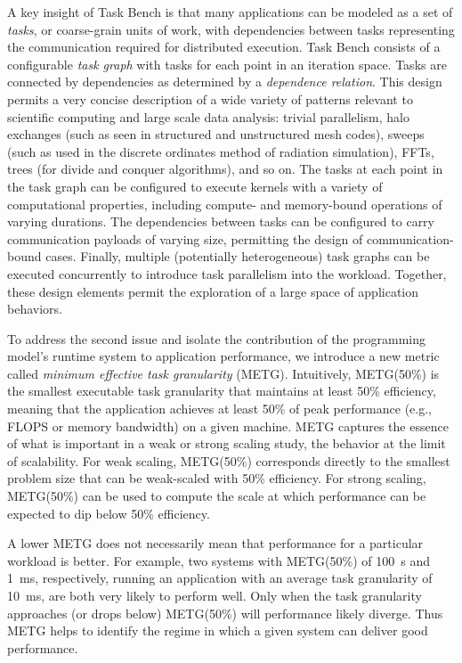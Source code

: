 A key insight of Task Bench is that many applications can be modeled
as a set of \emph{tasks}, or coarse-grain units of work, with
dependencies between tasks representing the communication required for
distributed execution. Task Bench consists of a configurable \emph{task graph} with tasks for
each point in an iteration space. Tasks are connected by dependencies
as determined by a \emph{dependence relation}. This design permits a
very concise description of a wide variety of patterns relevant to
scientific computing and large scale data analysis: trivial parallelism, halo exchanges (such as
seen in structured and unstructured mesh codes), sweeps (such as used
in the discrete ordinates method of radiation simulation), FFTs, trees
(for divide and conquer algorithms), and so on. The tasks at each
point in the task graph can be configured to execute kernels with a
variety of computational properties, including compute- and
memory-bound operations of varying durations. The dependencies between
tasks can be configured to carry communication payloads of varying size, permitting
the design of communication-bound cases. Finally, multiple
(potentially heterogeneous) task graphs can be executed concurrently
to introduce task parallelism into the workload. Together, these
design elements permit the exploration of a large space of application
behaviors.

To address the second issue and isolate the contribution of the programming model's runtime system to application performance, we introduce a new metric called \emph{minimum effective task granularity} (METG). Intuitively, METG(50\%) is the smallest executable task granularity that maintains at least 50\% efficiency, meaning that the application achieves at least 50\% of peak
performance (e.g., FLOPS or memory bandwidth) on a given machine. METG captures the essence of what is important in a weak
or strong scaling study, the behavior at the limit of scalability. For
weak scaling, METG(50\%) corresponds directly to the smallest problem size that can be weak-scaled with 50\% efficiency. For strong scaling, METG(50\%) can be used to compute the scale at which performance can be expected to dip below 50\% efficiency.

A lower METG does not necessarily mean that performance for a particular workload is
better. For example, two systems with METG(50\%) of 100~\textmu{}s and 1~ms,
respectively, running an application with an average task granularity
of 10~ms, are both very likely to perform well. Only when the task
granularity approaches (or drops below) METG(50\%) will performance
likely diverge. Thus METG helps to identify the regime in which a
given system can deliver good performance.


